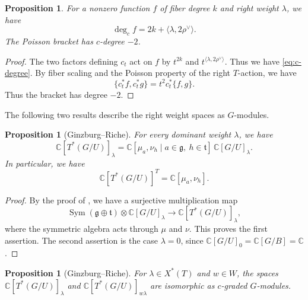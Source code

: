 \documentclass[12pt]{article}
\theoremstyle{paperplain}
\newtheorem{proposition}[theorem]{Proposition}
\theoremstyle{paperdefinition}
\DeclareMathOperator{\Sym}{Sym}
\newcommand{\C}{\mathbb C}
\newcommand{\g}{\mathfrak g}
\newcommand{\tfrak}{\mathfrak t}
\begin{document}
\begin{proposition}\label{prop:c-degree}\label{prop:c-bracket}
    For a nonzero function $f$ of fiber degree $k$ and right weight $\lambda$, we have
    \begin{equation}\label{eq:c-degree}
        \deg_c f=2k+\langle\lambda,2\rho^\vee\rangle.
    \end{equation}
    The Poisson bracket has $c$-degree $-2$.
\end{proposition}

\begin{proof}
    The two factors defining $c_t$ act on $f$ by $t^{2k}$ and $t^{\langle\lambda,2\rho^\vee\rangle}$. Thus we have \eqref{eq:c-degree}. By fiber scaling and the Poisson property of the right $T$-action, we have
    $$
        \{c_t^*f,c_t^*g\}=t^2c_t^*\{f,g\}.
    $$
    Thus the bracket has degree $-2$.
\end{proof}

The following two results describe the right weight spaces as $G$-modules.

\begin{proposition}[Ginzburg--Riche]\label{prop:weight-spaces}
    For every dominant weight $\lambda$, we have
    $$
        \C[T^*(G/U)]_\lambda
        =\C[\mu_a,\nu_h\mid a\in\g,\ h\in\tfrak]\,\C[G/U]_\lambda.
    $$
    In particular, we have
    $$
        \C[T^*(G/U)]^T=\C[\mu_a,\nu_h].
    $$
\end{proposition}

\begin{proof}
    By the proof of \cite[Lemma~3.6.2]{GinzburgRiche}, we have a surjective multiplication map
    $$
        \Sym(\g\oplus\tfrak)\otimes\C[G/U]_\lambda
        \longrightarrow\C[T^*(G/U)]_\lambda,
    $$
    where the symmetric algebra acts through $\mu$ and $\nu$. This proves the first assertion. The second assertion is the case $\lambda=0$, since $\C[G/U]_0=\C[G/B]=\C$.
\end{proof}

\begin{proposition}[Ginzburg--Riche]\label{prop:weyl-symmetry}
    For $\lambda\in X^*(T)$ and $w\in W$, the spaces $\C[T^*(G/U)]_\lambda$ and $\C[T^*(G/U)]_{w\lambda}$ are isomorphic as $c$-graded $G$-modules.
\end{proposition}
\end{document}
